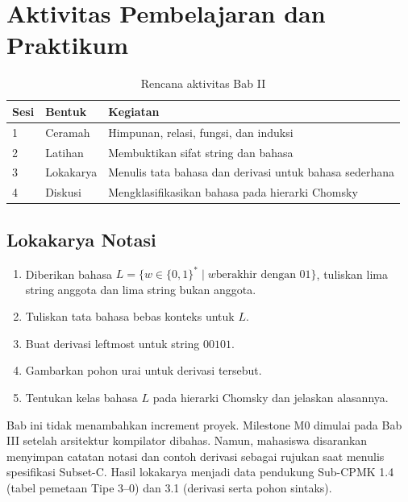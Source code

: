 \section*{Aktivitas Pembelajaran dan Praktikum}

\begin{table}[H]
\centering
\caption{Rencana aktivitas Bab II}
\label{tab:ch02-aktivitas}
\begin{tabularx}{\textwidth}{@{}llX@{}}
\toprule
\textbf{Sesi} & \textbf{Bentuk} & \textbf{Kegiatan} \\
\midrule
1 & Ceramah & Himpunan, relasi, fungsi, dan induksi \\
2 & Latihan & Membuktikan sifat string dan bahasa \\
3 & Lokakarya & Menulis tata bahasa dan derivasi untuk bahasa sederhana \\
4 & Diskusi & Mengklasifikasikan bahasa pada hierarki Chomsky \\
\bottomrule
\end{tabularx}
\end{table}

\subsection*{Lokakarya Notasi}
\begin{enumerate}[label=\arabic*.,leftmargin=*]
  \item Diberikan bahasa \(L = \{w \in \{0,1\}^{*} \mid w \text{
        berakhir dengan } 01\}\), tuliskan lima string anggota dan
        lima string bukan anggota.
  \item Tuliskan tata bahasa bebas konteks untuk \(L\).
  \item Buat derivasi leftmost untuk string \(00101\).
  \item Gambarkan pohon urai untuk derivasi tersebut.
  \item Tentukan kelas bahasa \(L\) pada hierarki Chomsky dan
        jelaskan alasannya.
\end{enumerate}

Bab ini tidak menambahkan increment proyek. Milestone M0 dimulai pada
Bab III setelah arsitektur kompilator dibahas. Namun, mahasiswa
disarankan menyimpan catatan notasi dan contoh derivasi sebagai
rujukan saat menulis spesifikasi Subset-C. Hasil lokakarya menjadi
data pendukung Sub-CPMK 1.4 (tabel pemetaan Tipe 3--0) dan 3.1
(derivasi serta pohon sintaks).
